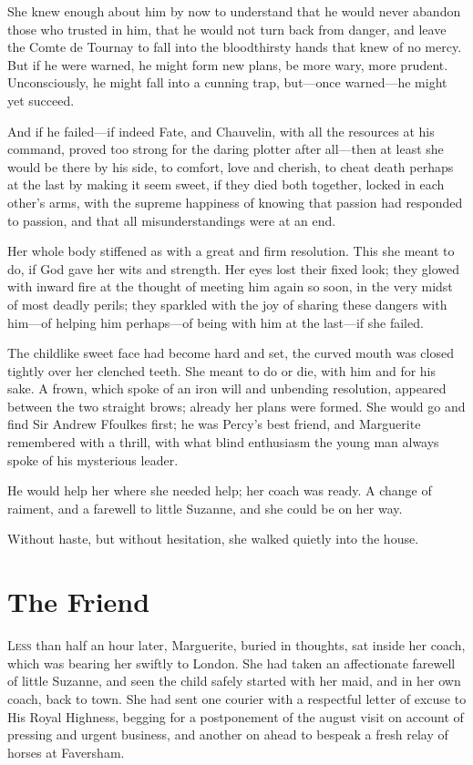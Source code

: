 \documentclass[paper=5.5in:8.5in,BCOR=7mm,twoside,DIV=calc,12pt,usegeometry,chapterprefix,endperiod,headings=big]{scrbook}
\begin{document}
She knew enough about him by now to understand that he would never abandon those who trusted in him, that he would not turn back from danger, and leave the Comte de Tournay to fall into the bloodthirsty hands that knew of no mercy. But if he were warned, he might form new plans, be more wary, more prudent. Unconsciously, he might fall into a cunning trap, but---once warned---he might yet succeed.

And if he failed---if indeed Fate, and Chauvelin, with all the resources at his command, proved too strong for the daring plotter after all---then at least she would be there by his side, to comfort, love and cherish, to cheat death perhaps at the last by making it seem sweet, if they died both together, locked in each other's arms, with the supreme happiness of knowing that passion had responded to passion, and that all misunderstandings were at an end.

Her whole body stiffened as with a great and firm resolution. This she meant to do, if God gave her wits and strength. Her eyes lost their fixed look; they glowed with inward fire at the thought of meeting him again so soon, in the very midst of most deadly perils; they sparkled with the joy of sharing these dangers with him---of helping him perhaps---of being with him at the last---if she failed.

The childlike sweet face had become hard and set, the curved mouth was closed tightly over her clenched teeth. She meant to do or die, with him and for his sake. A frown, which spoke of an iron will and unbending resolution, appeared between the two straight brows; already her plans were formed. She would go and find Sir Andrew Ffoulkes first; he was Percy's best friend, and Marguerite remembered with a thrill, with what blind enthusiasm the young man always spoke of his mysterious leader.

He would help her where she needed help; her coach was ready. A change of raiment, and a farewell to little Suzanne, and she could be on her way.

Without haste, but without hesitation, she walked quietly into the house.

\chapter{The Friend}
\lettrine[lines=4]{L}{ess} than half an hour later, Marguerite, buried in thoughts, sat inside her coach, which was bearing her swiftly to London. She had taken an affectionate farewell of little Suzanne, and seen the child safely started with her maid, and in her own coach, back to town. She had sent one courier with a respectful letter of excuse to His Royal Highness, begging for a postponement of the august visit on account of pressing and urgent business, and another on ahead to bespeak a fresh relay of horses at Faversham.
\end{document}
